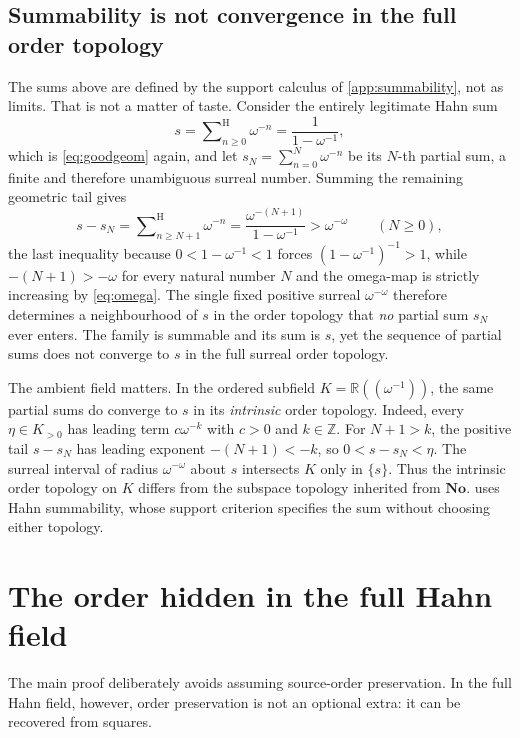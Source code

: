 \documentclass[11pt,letterpaper]{article}
\theoremstyle{definition}
\theoremstyle{remark}
\newcommand{\No}{\mathbf{No}}
\newcommand{\R}{\mathbb R}
\newcommand{\Z}{\mathbb Z}
\newcommand{\seqsum}{\mathop{\sum}\nolimits^{\mathrm H}}
\begin{document}
\subsection{Summability is not convergence in the full order topology}\label{sec:notlimit}
The sums above are defined by the support calculus of
\cref{app:summability}, not as limits. That is not a matter of taste. Consider
the entirely legitimate Hahn sum
\[
 s=\seqsum_{n\ge0}\omega^{-n}=\frac{1}{1-\omega^{-1}},
\]
which is \eqref{eq:goodgeom} again, and let $s_N=\sum_{n=0}^{N}\omega^{-n}$ be
its $N$-th partial sum, a finite and therefore unambiguous surreal number.
Summing the remaining geometric tail gives
\[
 s-s_N=\seqsum_{n\ge N+1}\omega^{-n}
      =\frac{\omega^{-(N+1)}}{1-\omega^{-1}}
      >\omega^{-\omega}\qquad(N\ge0),
\]
the last inequality because $0<1-\omega^{-1}<1$ forces
$(1-\omega^{-1})^{-1}>1$, while $-(N+1)>-\omega$ for every natural number $N$
and the omega-map is strictly increasing by \eqref{eq:omega}. The single fixed positive
surreal $\omega^{-\omega}$ therefore determines a neighbourhood of $s$ in the
order topology that \emph{no} partial sum $s_N$ ever enters. The family is
summable and its sum is $s$, yet the sequence of partial sums does not
converge to $s$ in the full surreal order topology.

The ambient field matters. In the ordered subfield
$K=\R((\omega^{-1}))$, the same partial sums do converge to $s$ in its
\emph{intrinsic} order topology. Indeed, every $\eta\in K_{>0}$ has leading
term $c\omega^{-k}$ with $c>0$ and $k\in\Z$. For $N+1>k$, the positive
tail $s-s_N$ has leading exponent $-(N+1)<-k$, so $0<s-s_N<\eta$.
The surreal interval of radius $\omega^{-\omega}$ about $s$ intersects $K$
only in $\{s\}$. Thus the intrinsic order topology on $K$ differs from the
subspace topology inherited from $\No$.  uses Hahn summability,
whose support criterion specifies the sum without choosing either topology.

\section{The order hidden in the full Hahn field}\label{sec:order}
The main proof deliberately avoids assuming source-order preservation. In the
full Hahn field, however, order preservation is not an optional extra: it can
be recovered from squares.
\end{document}
